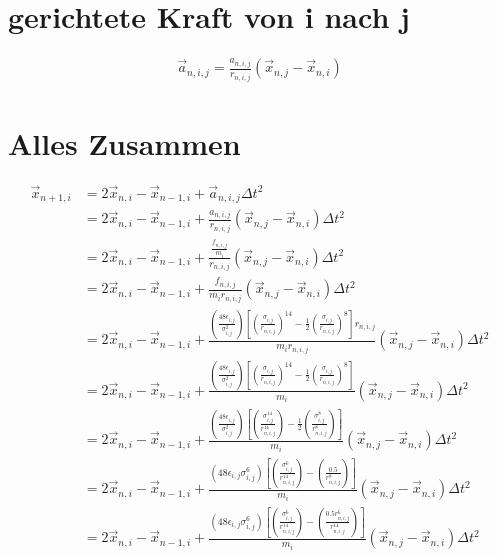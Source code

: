 \documentclass{article}
\begin{document}
\section*{gerichtete Kraft von i nach j}
\begin{align*}
	\vec{a}_{n,i,j}=\frac{a_{n,i,j}}{r_{n,i,j}}\left(\vec{x}_{n,j}-\vec{x}_{n,i}\right)
\end{align*}
\newpage
\section*{Alles Zusammen}
\begin{align}
	\vec{x}_{n+1,i}&=2\vec{x}_{n,i}-\vec{x}_{n-1,i}+\vec{a}_{n,i,j}\Delta t^2\\
	&=2\vec{x}_{n,i}-\vec{x}_{n-1,i}+\frac{a_{n,i,j}}{r_{n,i,j}}\left(\vec{x}_{n,j}-\vec{x}_{n,i}\right)\Delta t^2\\
	&=2\vec{x}_{n,i}-\vec{x}_{n-1,i}+\frac{\frac{f_{n,i,j}}{m_i}}{r_{n,i,j}}\left(\vec{x}_{n,j}-\vec{x}_{n,i}\right)\Delta t^2\\
	&=2\vec{x}_{n,i}-\vec{x}_{n-1,i}+\frac{f_{n,i,j}}{m_ir_{n,i,j}}\left(\vec{x}_{n,j}-\vec{x}_{n,i}\right)\Delta t^2\\
	&=2\vec{x}_{n,i}-\vec{x}_{n-1,i}+\frac{\left(\frac{48\epsilon_{i,j}}{\sigma_{i,j}^2}\right)\left[\left(\frac{\sigma_{i,j}}{r_{n,i,j}}\right)^{14}-\frac{1}{2}\left(\frac{\sigma_{i,j}}{r_{n,i,j}}\right)^8\right]r_{n,i,j}}{m_ir_{n,i,j}}\left(\vec{x}_{n,j}-\vec{x}_{n,i}\right)\Delta t^2\\
	&=2\vec{x}_{n,i}-\vec{x}_{n-1,i}+\frac{\left(\frac{48\epsilon_{i,j}}{\sigma_{i,j}^2}\right)\left[\left(\frac{\sigma_{i,j}}{r_{n,i,j}}\right)^{14}-\frac{1}{2}\left(\frac{\sigma_{i,j}}{r_{n,i,j}}\right)^8\right]}{m_i}\left(\vec{x}_{n,j}-\vec{x}_{n,i}\right)\Delta t^2\\
	&=2\vec{x}_{n,i}-\vec{x}_{n-1,i}+\frac{\left(\frac{48\epsilon_{i,j}}{\sigma_{i,j}^2}\right)\left[\left(\frac{\sigma_{i,j}^{14}}{r_{n,i,j}^{14}}\right)-\frac{1}{2}\left(\frac{\sigma_{i,j}^8}{r_{n,i,j}^8}\right)\right]}{m_i}\left(\vec{x}_{n,j}-\vec{x}_{n,i}\right)\Delta t^2\\
	&=2\vec{x}_{n,i}-\vec{x}_{n-1,i}+\frac{\left(48\epsilon_{i,j}\sigma_{i,j}^{6}\right)\left[\left(\frac{\sigma_{i,j}^{6}}{r_{n,i,j}^{14}}\right)-\left(\frac{0.5}{r_{n,i,j}^8}\right)\right]}{m_i}\left(\vec{x}_{n,j}-\vec{x}_{n,i}\right)\Delta t^2\\
	&=2\vec{x}_{n,i}-\vec{x}_{n-1,i}+\frac{\left(48\epsilon_{i,j}\sigma_{i,j}^{6}\right)\left[\left(\frac{\sigma_{i,j}^{6}}{r_{n,i,j}^{14}}\right)-\left(\frac{0.5r_{n,i,j}^6}{r_{n,i,j}^{14}}\right)\right]}{m_i}\left(\vec{x}_{n,j}-\vec{x}_{n,i}\right)\Delta t^2\\

\end{align}
\end{document}
